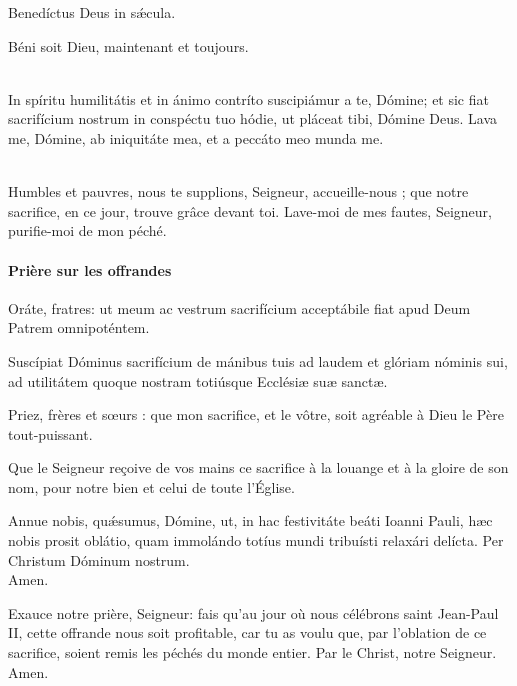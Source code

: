 \documentclass[twoside]{article}
\begin{document}
\begin{paracol}{2}
Benedíctus Deus in sǽcula. 

\switchcolumn

Béni soit Dieu, maintenant et toujours.

\switchcolumn*

\\
In spíritu humilitátis et in ánimo contríto
suscipiámur a te, Dómine;
et sic fiat sacrifícium nostrum in conspéctu tuo hódie,
ut pláceat tibi, Dómine Deus. 
Lava me, Dómine, ab iniquitáte mea,
et a peccáto meo munda me. 

\switchcolumn

~\\
Humbles et pauvres, nous te supplions, Seigneur, accueille-nous ; que notre sacrifice, en ce jour, trouve grâce devant toi. Lave-moi de mes fautes, Seigneur, purifie-moi de mon péché.
\end{paracol}

\paragraph{Prière sur les offrandes}
\begin{paracol}{2}

\vv Oráte, fratres:
ut meum ac vestrum sacrifícium
acceptábile fiat apud Deum Patrem omnipoténtem.

\rr Suscípiat Dóminus sacrifícium de mánibus tuis
ad laudem et glóriam nóminis sui,
ad utilitátem quoque nostram
totiúsque Ecclésiæ suæ sanctæ.

\switchcolumn

\vv Priez, frères et sœurs : que mon sacrifice, et le vôtre, soit agréable à Dieu le Père tout-puissant.

\rr Que le Seigneur reçoive de vos mains ce sacrifice à la louange et à la gloire de son nom, pour notre bien et celui de toute l’Église.

\switchcolumn*

Annue nobis, quǽsumus, Dómine,
ut, in hac festivitáte beáti Ioanni Pauli, hæc nobis prosit oblátio,
quam immolándo totíus mundi tribuísti relaxári delícta.
Per Christum Dóminum nostrum.\\
\rr Amen.

\switchcolumn
Exauce notre prière, Seigneur: fais qu'au jour où nous célébrons saint Jean-Paul II, 
cette offrande nous soit profitable, car tu as voulu que, par l'oblation de ce sacrifice,
soient remis les péchés du monde entier. Par le Christ, notre Seigneur.\\
\rr Amen.

\end{paracol}
\end{document}
